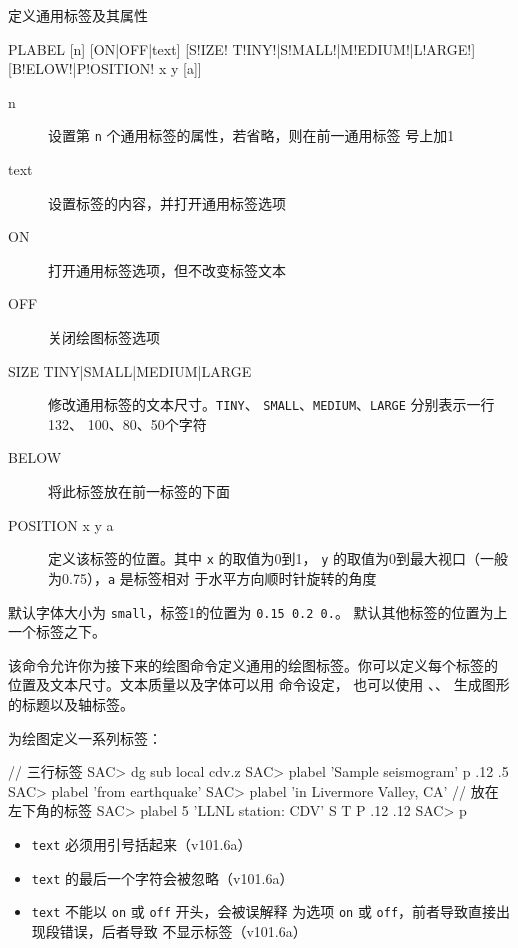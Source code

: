 \label{cmd:plabel}

定义通用标签及其属性

\begin{SACSTX}
PLABEL [n] [ON|OFF|text] [S!IZE! T!INY!|S!MALL!|M!EDIUM!|L!ARGE!]
    [B!ELOW!|P!OSITION! x y [a]]
\end{SACSTX}

\begin{description}
\item [n] 设置第 \texttt{n} 个通用标签的属性，若省略，则在前一通用标签
    号上加1
\item [text] 设置标签的内容，并打开通用标签选项
\item [ON] 打开通用标签选项，但不改变标签文本
\item [OFF] 关闭绘图标签选项
\item [SIZE TINY|SMALL|MEDIUM|LARGE] 修改通用标签的文本尺寸。\texttt{TINY}、
    \texttt{SMALL}、\texttt{MEDIUM}、\texttt{LARGE} 分别表示一行132、
    100、80、50个字符
\item [BELOW] 将此标签放在前一标签的下面
\item [POSITION x y a] 定义该标签的位置。其中 \texttt{x} 的取值为0到1，
    \texttt{y} 的取值为0到最大视口（一般为0.75），\texttt{a} 是标签相对
    于水平方向顺时针旋转的角度
\end{description}

默认字体大小为 \texttt{small}，标签1的位置为 \texttt{0.15 0.2 0.}。
默认其他标签的位置为上一个标签之下。

该命令允许你为接下来的绘图命令定义通用的绘图标签。你可以定义每个标签的
位置及文本尺寸。文本质量以及字体可以用  命令设定，
也可以使用 、、
生成图形的标题以及轴标签。

为绘图定义一系列标签：
\begin{SACCode}
// 三行标签
SAC> dg sub local cdv.z
SAC> plabel 'Sample seismogram' p .12 .5
SAC> plabel 'from earthquake'
SAC> plabel 'in Livermore Valley, CA'
// 放在左下角的标签
SAC> plabel 5 'LLNL station: CDV' S T P .12 .12
SAC> p
\end{SACCode}

\begin{itemize}
\item \texttt{text} 必须用引号括起来（v101.6a）
\item \texttt{text} 的最后一个字符会被忽略（v101.6a）
\item \texttt{text} 不能以 \texttt{on} 或 \texttt{off} 开头，会被误解释
    为选项 \texttt{on} 或 \texttt{off}，前者导致直接出现段错误，后者导致
    不显示标签（v101.6a）
\end{itemize}
